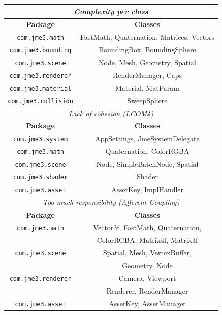 \documentclass[a4paper, 10pt]{article}
\begin{document}
\begin{tabular}{|c|c|}
\hline
\multicolumn{2}{|c|}{\textit{Complexity per class}}\\
\hline
\textbf{Package} & \textbf{Classes}\\
\hline
\verb|com.jme3.math|			& FastMath, Quaternation, Matrices, Vectors\\
\hline
\verb|com.jme3.bounding|		& BoundingBox, BoundingSphere\\
\hline
\verb|com.jme3.scene|			& Node, Mesh, Geometry, Spatial\\
\hline
\verb|com.jme3.renderer|		& RenderManager, Caps\\
\hline
\verb|com.jme3.material|		& Material, MatParam\\
\hline
\verb|com.jme3.collision|		& SweepSphere\\
\hline

\hline
\multicolumn{2}{|c|}{\textit{Lack of cohesion (LCOM4)}}\\
\hline
\textbf{Package} & \textbf{Classes}\\
\hline
\verb|com.jme3.system|		& AppSettings, JmeSystemDelegate\\
\hline
\verb|com.jme3.math|		& Quaternation, ColorRGBA\\
\hline
\verb|com.jme3.scene|		& Node, SimpleBatchNode, Spatial\\
\hline
\verb|com.jme3.shader|		& Shader\\
\hline
\verb|com.jme3.asset|		& AssetKey, ImplHandler\\
\hline

\hline
\multicolumn{2}{|c|}{\textit{Too much responsibility (Afferent Coupling)}}\\
\hline
\textbf{Package} & \textbf{Classes}\\
\hline
\verb|com.jme3.math|		& Vector3f, FastMath, Quaternation,\\
                                & ColorRGBA, Matrix4f, Matrix3f\\
\hline
\verb|com.jme3.scene|		& Spatial, Mesh, VertexBuffer,\\
				& Geometry, Node\\
\hline
\verb|com.jme3.renderer|	& Camera, Viewport\\
				& Renderer, RenderManager\\
\hline
\verb|com.jme3.asset|		& AssetKey, AssetManager\\
\hline


\end{tabular}
\end{document}

